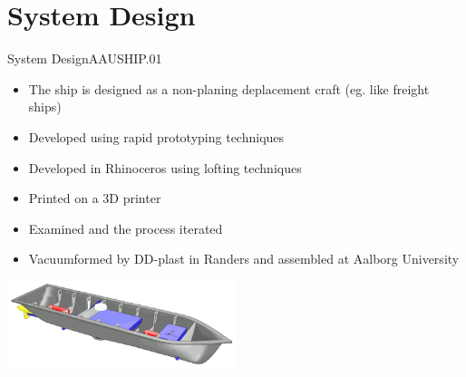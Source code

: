 \documentclass[10pt,handout]{beamer}
\begin{document}


\section{System Design}
\begin{frame}{System Design}{AAUSHIP.01}
\begin{itemize}
  \item The ship is designed as a non-planing deplacement craft (eg. like freight ships)
  \item Developed using rapid prototyping techniques
  \item Developed in Rhinoceros using lofting techniques
  \item Printed on a 3D printer
  \item Examined and the process iterated
  \item Vacuumformed by DD-plast in Randers and assembled at Aalborg University
\end{itemize}
\begin{center}
\includegraphics[width=0.5\textwidth]{img/blender-render}
\end{center}
\end{frame}
\end{document}
